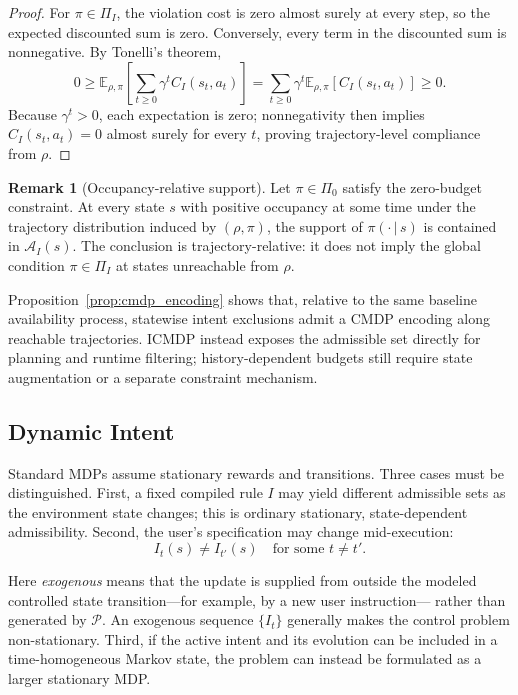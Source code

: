 \documentclass[journal]{IEEEtran}
\theoremstyle{definition}
\newtheorem{remark}{Remark}[section]
\newcommand{\cA}{\mathcal{A}}
\newcommand{\cP}{\mathcal{P}}
\newcommand{\E}{\mathbb{E}}
\newcommand{\given}{\,\vert\,}
\begin{document}
\begin{proof}
For $\pi\in\Pi_I$, the violation cost is zero almost surely at every step, so
the expected discounted sum is zero. Conversely, every term in the discounted
sum is nonnegative. By Tonelli's theorem,
\[
  0 \geq
  \E_{\rho,\pi}\!\left[\sum_{t\geq0}\gamma^tC_I(s_t,a_t)\right]
  =\sum_{t\geq0}\gamma^t\E_{\rho,\pi}[C_I(s_t,a_t)]
  \geq 0.
\]
Because $\gamma^t>0$, each expectation is zero; nonnegativity then implies
$C_I(s_t,a_t)=0$ almost surely for every $t$, proving trajectory-level
compliance from $\rho$.
\end{proof}

\begin{remark}[Occupancy-relative support]
Let $\pi\in\Pi_0$ satisfy the zero-budget constraint. At every state $s$ with
positive occupancy at some time under the trajectory distribution induced by
$(\rho,\pi)$, the support of $\pi(\cdot\given s)$ is contained in $\cA_I(s)$.
The conclusion is trajectory-relative: it does not imply the global condition
$\pi\in\Pi_I$ at states unreachable from $\rho$.
\end{remark}

Proposition~\ref{prop:cmdp_encoding} shows that, relative to the same baseline
availability process, statewise intent exclusions admit a CMDP encoding along
reachable trajectories. ICMDP instead exposes the admissible set directly for
planning and runtime filtering; history-dependent budgets still require state
augmentation or a separate constraint mechanism.

\subsection{Dynamic Intent}
\label{subsec:extensions}

Standard MDPs assume stationary rewards and transitions. Three cases
must be distinguished. First, a fixed compiled rule $I$ may yield different
admissible sets as the environment state changes; this is ordinary stationary,
state-dependent admissibility. Second, the user's specification may change
mid-execution:
\begin{equation}
  I_t(s) \neq I_{t'}(s) \quad \text{for some } t \neq t'.
  \label{eq:dynamic_intent}
\end{equation}

Here \emph{exogenous} means that the update is supplied from outside the
modeled controlled state transition---for example, by a new user instruction---
rather than generated by $\cP$. An exogenous sequence $\{I_t\}$ generally
makes the control problem non-stationary. Third, if the active intent and its
evolution can be included in a time-homogeneous Markov state, the problem can
instead be formulated as a larger stationary MDP.
\end{document}

